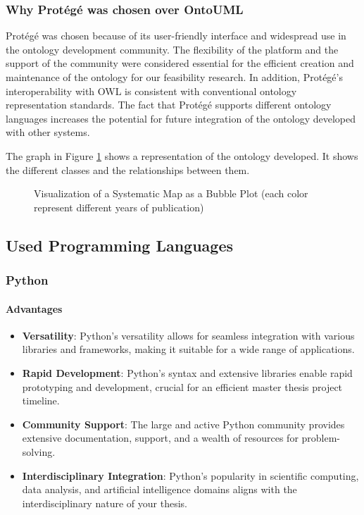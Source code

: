     \subsubsection{Why Protégé was chosen over OntoUML}
    Protégé was chosen because of its user-friendly interface and widespread use in the ontology development community. The flexibility of the platform and the support of the community were considered essential for the efficient creation and maintenance of the ontology for our feasibility research. In addition, Protégé's interoperability with OWL is consistent with conventional ontology representation standards. The fact that Protégé supports different ontology languages increases the potential for future integration of the ontology developed with other systems.
    
    The graph in Figure \ref{fig:viz-ontology} shows a representation of the ontology developed. It shows the different classes and the relationships between them.
    
    \begin{figure}[p]
        
         \caption{\label{fig:viz-ontology}  Visualization of a Systematic Map as a Bubble Plot (each color represent different years of publication)}
    \end{figure}

    
\subsection{Used Programming Languages}
    \subsubsection{Python}
        \paragraph{Advantages}
        \begin{itemize}
            \item \textbf{Versatility}: Python's versatility allows for seamless integration with various libraries and frameworks, making it suitable for a wide range of applications.
            \item \textbf{Rapid Development}: Python's syntax and extensive libraries enable rapid prototyping and development, crucial for an efficient master thesis project timeline.
            \item \textbf{Community Support}: The large and active Python community provides extensive documentation, support, and a wealth of resources for problem-solving.
            \item \textbf{Interdisciplinary Integration}: Python's popularity in scientific computing, data analysis, and artificial intelligence domains aligns with the interdisciplinary nature of your thesis.
        \end{itemize}
        
